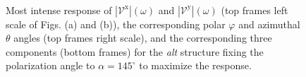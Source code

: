 \documentclass[prb,11pt,tightenlines,twocolumn,aps]{revtex4-1}
\begin{document}
\begin{figure}[tb]
    \centering
    \\

    \caption{Most intense response of
    $|\mathcal{V}^{\mathrm{x}}|(\omega)$ and
    $|\mathcal{V}^{\mathrm{y}}|(\omega)$ (top frames left scale of Figs. (a) and
    (b)), the corresponding polar $\varphi$ and azimuthal $\theta$ angles (top
    frames right scale), and the corresponding three components (bottom frames)
    for the \emph{alt} structure fixing the polarization angle to
    $\alpha=145^{\circ}$ to maximize the response.}
    \label{fig:alt-vab-comp-rtp}
\end{figure}
\end{document}
